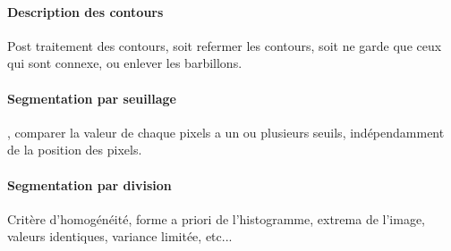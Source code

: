 \documentclass{article}
\begin{document}
\paragraph{Description des contours}
Post traitement des contours, soit refermer les contours, soit ne garde que ceux qui sont connexe, ou enlever les barbillons. 
\paragraph{Segmentation par seuillage}, comparer la valeur de chaque pixels a un ou plusieurs seuils, indépendamment de la position des pixels.
\paragraph{Segmentation par division} Critère d’homogénéité, forme a priori de l'histogramme, extrema de l'image, valeurs identiques, variance limitée, etc...
\end{document}
